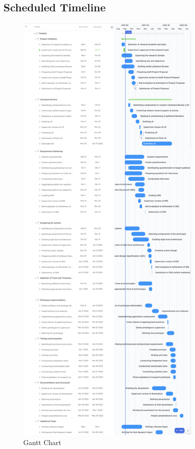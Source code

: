 \documentclass[a4paper, 12pt, oneside]{report}
\begin{document}
\subsection{Scheduled Timeline}
\begin{figure}[h!]
\centering
\includegraphics[width=0.8\textwidth,height=0.9\textheight]{images/gantt-chart.png}
\caption{Gantt Chart}
\end{figure}
\end{document}
